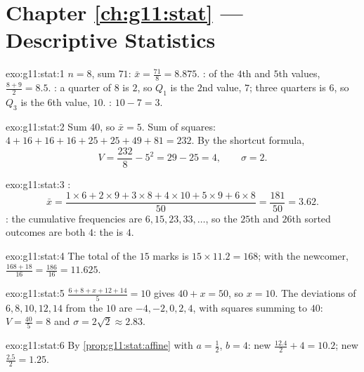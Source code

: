 \section*{Chapter \ref{ch:g11:stat} --- Descriptive Statistics}

\begin{solution}{exo:g11:stat:1}
$n = 8$, sum $71$:  $\bar x = \frac{71}{8} = 8.875$. : 
of the $4$th and $5$th values, $\frac{8 + 9}{2} = 8.5$. : a
quarter of $8$ is $2$, so $Q_1$ is the $2$nd value, $7$; three quarters is
$6$, so $Q_3$ is the $6$th value, $10$. :
$10 - 7 = 3$.
\end{solution}

\begin{solution}{exo:g11:stat:2}
Sum $40$, so $\bar x = 5$. Sum of squares:
$4 + 16 + 16 + 16 + 25 + 25 + 49 + 81 = 232$. By the shortcut formula,
\[
V = \frac{232}{8} - 5^2 = 29 - 25 = 4,
\qquad
\sigma = 2 .
\]
\end{solution}

\begin{solution}{exo:g11:stat:3}
:
\[
\bar x = \frac{1 \times 6 + 2 \times 9 + 3 \times 8 + 4 \times 10
+ 5 \times 9 + 6 \times 8}{50}
= \frac{181}{50} = 3.62 .
\]
: the cumulative frequencies are $6, 15, 23, 33, \dots$, so the
$25$th and $26$th sorted outcomes are both $4$: the  is $4$.
\end{solution}

\begin{solution}{exo:g11:stat:4}
The total of the $15$ marks is $15 \times 11.2 = 168$; with the
newcomer, $\frac{168 + 18}{16} = \frac{186}{16} = 11.625$.
\end{solution}

\begin{solution}{exo:g11:stat:5}
$\frac{6 + 8 + x + 12 + 14}{5} = 10$ gives $40 + x = 50$, so $x = 10$.
The deviations of $6, 8, 10, 12, 14$ from the  $10$ are
$-4, -2, 0, 2, 4$, with squares summing to $40$:
$V = \frac{40}{5} = 8$ and $\sigma = 2\sqrt2 \approx 2.83$.
\end{solution}

\begin{solution}{exo:g11:stat:6}
By \cref{prop:g11:stat:affine} with $a = \frac12$, $b = 4$: new 
$\frac{12.4}{2} + 4 = 10.2$; new 
$\frac{2.5}{2} = 1.25$.
\end{solution}

